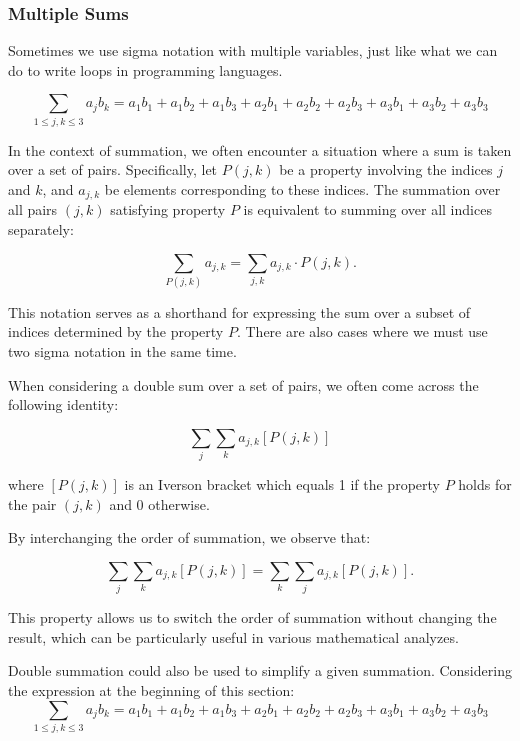 \subsubsection{Multiple Sums}
Sometimes we use sigma notation with multiple variables, just like what we can do to write loops in programming languages.

    
$$\sum_{1 \leq j, k \leq 3} a_j b_k = a_1b_1 + a_1b_2 + a_1b_3 + a_2b_1 + a_2b_2 + a_2b_3 + a_3b_1 + a_3b_2 + a_3b_3 $$


In the context of summation, we often encounter a situation where a sum is taken over a set of pairs. Specifically, let \( P(j, k) \) be a property involving the indices \( j \) and \( k \), and \( a_{j,k} \) be elements corresponding to these indices. The summation over all pairs \( (j, k) \) satisfying property \( P \) is equivalent to summing over all indices separately:

\[
\sum_{P(j,k)} a_{j,k} = \sum_{j,k} a_{j,k} \cdot P(j,k).
\]

This notation serves as a shorthand for expressing the sum over a subset of indices determined by the property \( P \).
There are also cases where we must use two sigma notation in the same time.

 
\begin{example}
    When considering a double sum over a set of pairs, we often come across the following identity:

\begin{equation}
\sum_{j}\sum_{k} a_{j,k} [P(j,k)]
\end{equation}

where \( [P(j,k)] \) is an Iverson bracket which equals 1 if the property \( P \) holds for the pair \( (j,k) \) and 0 otherwise.
\end{example}


By interchanging the order of summation, we observe that:

\begin{equation}
\sum_{j}\sum_{k} a_{j,k} [P(j,k)] = \sum_{k}\sum_{j} a_{j,k} [P(j,k)].
\end{equation}

This property allows us to switch the order of summation without changing the result, which can be particularly useful in various mathematical analyzes.

Double summation could also be used to simplify a given summation.
Considering the expression at the beginning of this section:
$$\sum_{1 \leq j, k \leq 3} a_j b_k = a_1b_1 + a_1b_2 + a_1b_3 + a_2b_1 + a_2b_2 + a_2b_3 + a_3b_1 + a_3b_2 + a_3b_3 $$

